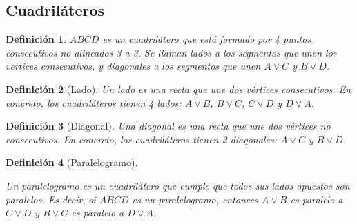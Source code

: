 \documentclass[11pt, a4paper]{article}
\newif\IfInSansMode
\let\oldsf\sffamily
\renewcommand*{\sffamily}{\oldsf\mathversion{sans}\InSansModetrue}
\theoremstyle{theorem-style}
\theoremstyle{definition-style}
\newtheorem{ndef}{Definición}[section]
\theoremstyle{remark-style}
\theoremstyle{example-style}
\begin{document}
\subsection{Cuadriláteros}

\begin{ndef}
  $ABCD$ es un cuadrilátero que está formado por 4 puntos consecutivos no alineados 3 a 3. Se llaman \textit{lados} a los segmentos que unen los vertices consecutivos, y \textit{diagonales} a los segmentos que unen $A \vee C$ y $B \vee D$.
\end{ndef}

\begin{ndef}[Lado]
  Un lado es una recta que une dos vértices consecutivos. En concreto, los cuadriláteros tienen 4 lados: $A \vee B$, $B \vee C$, $C \vee D$
  y $D \vee A$.
\end{ndef}

\begin{ndef}[Diagonal]
  Una diagonal es una recta que une dos vértices no consecutivos. En concreto, los cuadriláteros tienen 2 diagonales: $A \vee C$ y $B \vee D$.
\end{ndef}

\begin{ndef}[Paralelogramo]\hfill\\
\begin{minipage}[c]{0.70\textwidth}
  Un paralelogramo es un cuadrilátero que cumple que todos sus lados opuestos son paralelos. Es decir, si $ABCD$ es un
  paralelogramo, entonces $A \vee B$ es paralelo a $C \vee D$ y $B \vee C$ es paralelo a $D \vee A$.
\end{minipage}\hfill
\begin{minipage}[]{0.27\textwidth}
  \sffamily
\end{minipage}
\end{ndef}
\end{document}
